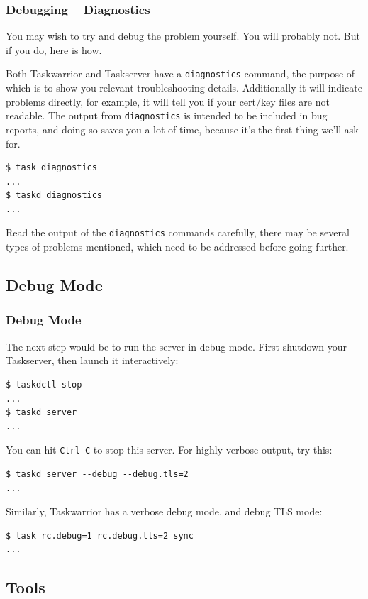 \documentclass[t,handout]{beamer}
\begin{document}
\begin{frame}[fragile]\frametitle{Debugging -- Diagnostics}
    \vfill
    You may wish to try and debug the problem yourself. You will probably not. But if you do, here is how.

    Both Taskwarrior and Taskserver have a \verb+diagnostics+ command, the purpose of which is to show you relevant troubleshooting details. Additionally it will indicate problems directly, for example, it will tell you if your cert/key files are not readable. The output from \verb+diagnostics+ is intended to be included in bug reports, and doing so saves you a lot of time, because it's the first thing we'll ask for.

    \begin{lstlisting}
$ task diagnostics
...
$ taskd diagnostics
...\end{lstlisting}

    Read the output of the \verb+diagnostics+ commands carefully, there may be several types of problems mentioned, which need to be addressed before going further.
\end{frame}

\subsection{Debug Mode}

\begin{frame}[fragile]\frametitle{Debug Mode}
    \vfill
    The next step would be to run the server in debug mode. First shutdown your Taskserver, then launch it interactively:

    \begin{lstlisting}
$ taskdctl stop
...
$ taskd server
...\end{lstlisting}

    You can hit \verb+Ctrl-C+ to stop this server. For highly verbose output, try this:
    \begin{lstlisting}
$ taskd server --debug --debug.tls=2
...\end{lstlisting}

    Similarly, Taskwarrior has a verbose debug mode, and debug TLS mode:
    \begin{lstlisting}
$ task rc.debug=1 rc.debug.tls=2 sync
...\end{lstlisting}
\end{frame}

\subsection{Tools}
\end{document}
